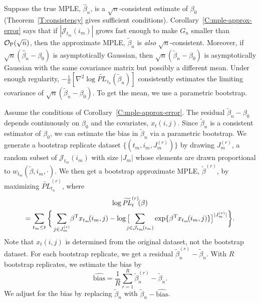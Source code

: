 \documentclass[aoas,preprint]{imsart}
\begin{document}
Suppose the true MPLE, $\hat \beta_n$, is a $\sqrt{n}$-consistent estimate of
$\beta_0$ (Theorem~\ref{T:consistency} gives sufficient conditions).  
Corollary~\ref{C:mple-approx-error} says that if
$|\mathcal{J}_{t_m}(i_m)|$ grows fast enough to make $G_n$ smaller than
$\mathcal{O}_\text{P}(\sqrt{n})$, then the approximate MPLE, $\tilde \beta_n$ is \emph{also}
$\sqrt{n}$-consistent.  
Moreover, if $\sqrt{n}(\hat \beta_n - \beta_0)$ is asymptotically Gaussian, 
then $\sqrt{n}(\tilde \beta_n - \beta_0)$ is asymptotically Gaussian with
the same covariance matrix but possibly a different mean.
Under enough regularity,
\(
    -\tfrac{1}{n} [
        \nabla^2 \log \widetilde{\mathit{PL}}_{\tau_n}(\tilde \beta_n)
    ]
\)
consistently estimates the limiting covariance
of $\sqrt{n}(\tilde \beta_n - \beta_0)$.  To get the mean, we use
a parametric bootstrap.

Assume the conditions of Corollary~\ref{C:mple-approx-error}.
The residual $\tilde \beta_n - \beta_0$ depends continuously on $\beta_0$
and the covariates, $x_t(i,j)$.  Since $\tilde \beta_n$ is a consistent
estimator of $\beta_0$, we can estimate the bias in $\tilde \beta_n$ via
a parametric bootstrap.  We generate a bootstrap replicate dataset
$\{ (t_m, i_m, J_m^{(r)}) \}$ by drawing $J_m^{(r)}$, a random subset
of $\mathcal{J}_{t_m}(i_m)$ with size $|J_m|$ whose elements are drawn
proportional to $w_{t_m}(\tilde \beta, i_m, \cdot)$.
We then get a bootstrap approximate MPLE, $\tilde \beta^{(r)}$, by maximizing
$\widetilde{\mathit{PL}}_{t_n}^{(r)}$, where
\begin{multline*}
    \log \widetilde{\mathit{PL}}_{t}^{(r)}\!(\beta) \\
        =
        \sum_{t_m \leq t}
        \bigg\{
            \sum_{j \in J_m^{(r)}}\!
                \beta^\trans x_{t_m}\!(i_m, j)
            -
            \log\big[
                \!\!\!\!
                \sum_{j \in \mathcal{J}_{t_m}\!(i_m)}
                    \exp\{ \beta^\trans x_{t_m}\!(i_m, j)\}
            \big]^{|J_m^{(r)}|}
        \bigg\}.
\end{multline*}
Note that $x_t(i,j)$ is determined from the original dataset, not the
bootstrap dataset.  For each bootstrap replicate, we get a residual
$\tilde \beta_n^{(r)} - \tilde \beta_n$.  With $R$ bootstrap
replicates, we estimate the bias by
\[
    \widehat{\mathrm{bias}}
        =
            \frac{1}{R} \sum_{r=1}^{R} \tilde \beta_n^{(r)} - \tilde \beta_n.
\]
We adjust for the bias by replacing $\tilde \beta_n$ with
$\tilde \beta_n - \widehat{\mathrm{bias}}$.
\end{document}
